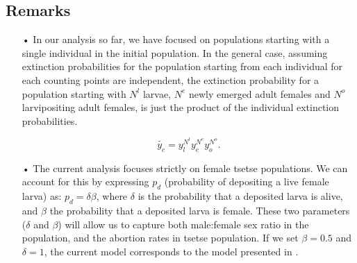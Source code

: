 \documentclass[smallextended]{svjour3}
\newcommand{\comment}[3]{\textcolor{#1}{\textbf{[#2: }\textit{#3}\textbf{]}}}
\newcommand{\jd}[1]{\comment{cyan}{JD}{#1}}
\newcommand{\eb}[1]{\comment{blue}{EB}{#1}}
\begin{document}
\subsection*{\bf Remarks}
\begin{itemize}
	\item[•] In our analysis so far, we have focused on populations starting with a single individual in the initial population. In the general case, assuming extinction probabilities for the population starting from each individual for each counting points are independent, the extinction probability for a population starting with $N^l$ larvae, $N^e$ newly emerged adult females and $N^o$ larvipositing adult females, is just the product of the individual extinction probabilities.
	
	$$\tilde{y_c}=y_l^{N^l} y_e^{N^e} y_o^{N^o}.$$

	\item[•] The current analysis focuses strictly on female tsetse populations. We can account for this  by expressing  $p_d$ (probability of depositing a live female larva) as:  $p_d =\delta \beta$, where $\delta$ is the probability that a deposited larva is alive, and $\beta$ the probability that a deposited larva is female.  These two parameters ($\delta$ and $\beta$) will allow us to capture both male:female sex ratio in the population, and  the abortion rates in tsetse population.  If we set $\beta = 0.5$ and $\delta = 1$, the current model corresponds to the model presented in \cite{Hargrove2005a}. 
\end{itemize}


\end{document}
